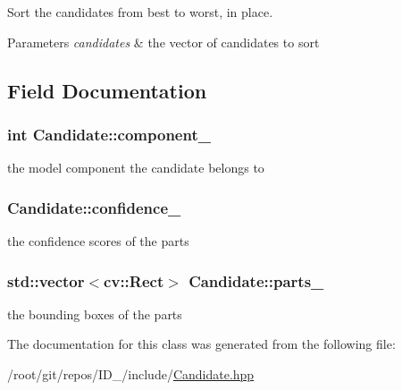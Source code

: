 \-Sort the candidates from best to worst, in place. 


\begin{DoxyParams}{\-Parameters}
{\em candidates} & the vector of candidates to sort \\
\hline
\end{DoxyParams}


\subsection{\-Field \-Documentation}
\hypertarget{classCandidate_a7866513384d74055891a237a524798ab}{
\subsubsection[{component\-\_\-}]{\setlength{\rightskip}{0pt plus 5cm}int {\bf \-Candidate\-::component\-\_\-}}}\label{classCandidate_a7866513384d74055891a237a524798ab}


the model component the candidate belongs to 

\hypertarget{classCandidate_a31785654c1d01cda9cadf93e919b30f1}{
\subsubsection[{confidence\-\_\-}]{ {\bf \-Candidate\-::confidence\-\_\-}}}\label{classCandidate_a31785654c1d01cda9cadf93e919b30f1}


the confidence scores of the parts 

\hypertarget{classCandidate_aa0e3d40adf86bff2e99f3e4234ce674b}{
\subsubsection[{parts\-\_\-}]{\setlength{\rightskip}{0pt plus 5cm}std\-::vector$<$cv\-::\-Rect$>$ {\bf \-Candidate\-::parts\-\_\-}}}\label{classCandidate_aa0e3d40adf86bff2e99f3e4234ce674b}


the bounding boxes of the parts 



\-The documentation for this class was generated from the following file\-:\begin{DoxyCompactItemize}
\item 
/root/git/repos/\-I\-D\-\_/include/\hyperlink{Candidate_8hpp}{\-Candidate.\-hpp}\end{DoxyCompactItemize}
